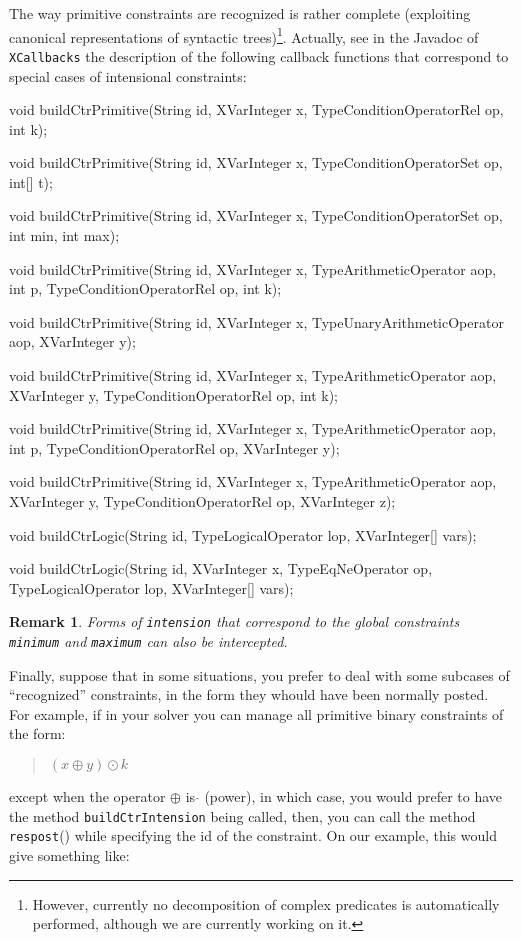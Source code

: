 \documentclass[10pt]{article}
\renewcommand\logowidth{15pt}
\newcommand\bcroue{\texttt{[image: figures/roue.png]}}
\newcounter{cntEx}
\newcommand{\core}[1]{ 
  \medskip \begin{tcolorbox}[
    enhanced,breakable,
    boxsep=0pt,top=0pt,bottom=0pt,left=8mm,right=1mm,
    toprule=0.1mm,leftrule=0.1mm,rightrule=0.25mm,bottomrule=0.25mm,shadow={0.2mm}{-0.2mm}{0mm}{dgray},
    overlay unbroken and first={\node (logo) at ([xshift=4mm,yshift=-5mm]frame.north west) {}; \draw[black,line width=1.5pt] ([xshift=4mm,yshift=-2.0mm]frame.north west) -- ([xshift=4mm,yshift=1.5mm]frame.south west);  },
    colframe=dgray,titlerule=-0.2mm,toptitle=3mm,coltitle=black,fonttitle=\bfseries,
    lines before break=6, pad at break*=10pt
}
\newenvironment{boxabsc}
    {\stepcounter{cntEx} \core{\bcroue} ,colback=colorex,title style={color=colorex}]} %
    {\end{tcolorbox}} %
\newtheorem{remark}{Remark}
\newcommand{\nn}[1]{{\tt #1}} %
\begin{document}
The way primitive constraints are recognized is rather complete (exploiting canonical representations of syntactic trees)\footnote{However, currently no decomposition of complex predicates is automatically performed, although we are currently working on it.}.
Actually, see in the Javadoc of \nn{XCallbacks} the description of the following callback functions that correspond to special cases of intensional constraints:

\begin{boxabsc}
\begin{absc}
void buildCtrPrimitive(String id, XVarInteger x, TypeConditionOperatorRel op,
    int k);

void buildCtrPrimitive(String id, XVarInteger x, TypeConditionOperatorSet op,
    int[] t);

void buildCtrPrimitive(String id, XVarInteger x, TypeConditionOperatorSet op,
    int min, int max);

void buildCtrPrimitive(String id, XVarInteger x, TypeArithmeticOperator aop,
    int p, TypeConditionOperatorRel op, int k);

void buildCtrPrimitive(String id, XVarInteger x, TypeUnaryArithmeticOperator aop,
    XVarInteger y);

void buildCtrPrimitive(String id, XVarInteger x, TypeArithmeticOperator aop,
    XVarInteger y, TypeConditionOperatorRel op, int k);

void buildCtrPrimitive(String id, XVarInteger x, TypeArithmeticOperator aop,
    int p, TypeConditionOperatorRel op, XVarInteger y);

void buildCtrPrimitive(String id, XVarInteger x, TypeArithmeticOperator aop,
    XVarInteger y, TypeConditionOperatorRel op, XVarInteger z);

    
void buildCtrLogic(String id, TypeLogicalOperator lop, XVarInteger[] vars);

void buildCtrLogic(String id, XVarInteger x, TypeEqNeOperator op,
     TypeLogicalOperator lop, XVarInteger[] vars);
\end{absc} 
\end{boxabsc}


\begin{remark}
  Forms of \nn{intension} that correspond to the global constraints \nn{minimum} and \nn{maximum} can also be intercepted.
\end{remark}


Finally, suppose that in some situations, you prefer to deal with some subcases of ``recognized'' constraints, in the form they whould have been normally posted.
For example, if in your solver you can manage all primitive binary constraints of the form:
\begin{quote}
$(x \oplus y) \odot k$
\end{quote}
except when the operator $\oplus$ is $\hat{}$ (power), in which case, you would prefer to have the method \nn{buildCtrIntension} being called,
then, you can call the method \nn{respost}() while specifying the id of the constraint.
On our example, this would give something like:
\end{document}
